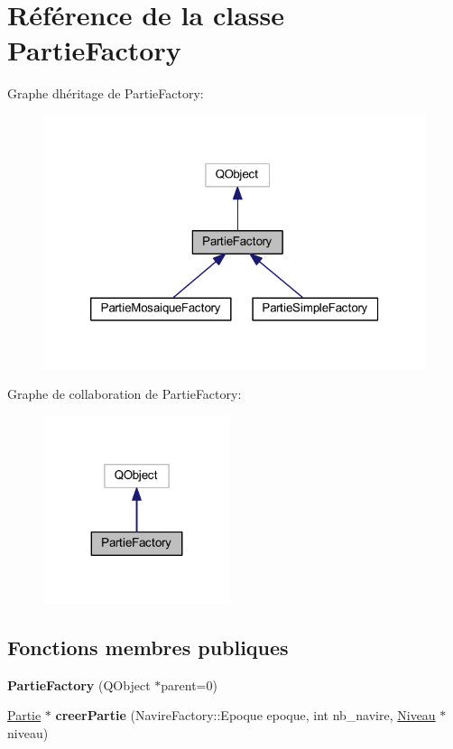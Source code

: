 \hypertarget{class_partie_factory}{}\section{Référence de la classe Partie\+Factory}
\label{class_partie_factory}


Graphe d\textquotesingle{}héritage de Partie\+Factory\+:
\nopagebreak
\begin{figure}[H]
\begin{center}
\leavevmode
\includegraphics[width=320pt]{class_partie_factory__inherit__graph}
\end{center}
\end{figure}


Graphe de collaboration de Partie\+Factory\+:
\nopagebreak
\begin{figure}[H]
\begin{center}
\leavevmode
\includegraphics[width=155pt]{class_partie_factory__coll__graph}
\end{center}
\end{figure}
\subsection*{Fonctions membres publiques}
\begin{DoxyCompactItemize}
\item 
{\bfseries Partie\+Factory} (Q\+Object $\ast$parent=0)\hypertarget{class_partie_factory_aa379328311144a9192f3bf662c7c6a3e}{}\label{class_partie_factory_aa379328311144a9192f3bf662c7c6a3e}

\item 
\hyperlink{class_partie}{Partie} $\ast$ {\bfseries creer\+Partie} (Navire\+Factory\+::\+Epoque epoque, int nb\+\_\+navire, \hyperlink{class_niveau}{Niveau} $\ast$niveau)\hypertarget{class_partie_factory_ae6146894dd3dc428122632ad6033d524}{}\label{class_partie_factory_ae6146894dd3dc428122632ad6033d524}

\end{DoxyCompactItemize}
